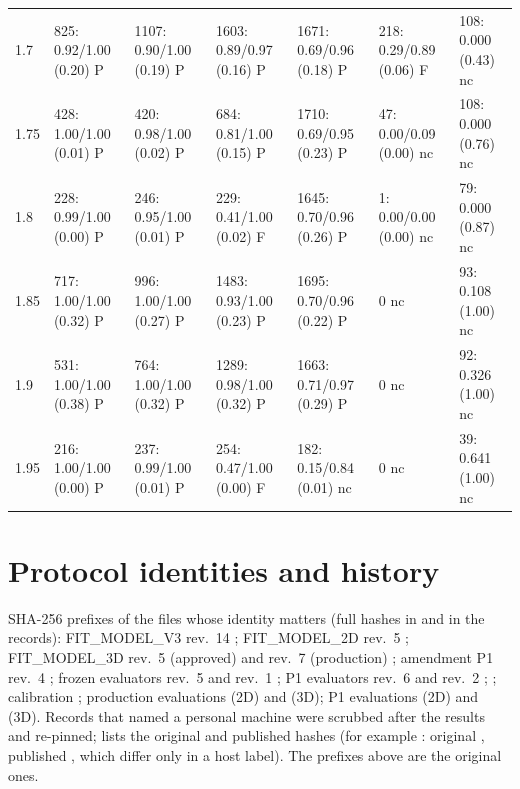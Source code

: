 \begin{table}
\begin{tabular}{@{}lllllll@{}}
1.7 & 825: 0.92/1.00 (0.20) P & 1107: 0.90/1.00 (0.19) P & 1603: 0.89/0.97 (0.16) P & 1671: 0.69/0.96 (0.18) P & 218: 0.29/0.89 (0.06) F & 108: 0.000 (0.43) nc \\
1.75 & 428: 1.00/1.00 (0.01) P & 420: 0.98/1.00 (0.02) P & 684: 0.81/1.00 (0.15) P & 1710: 0.69/0.95 (0.23) P & 47: 0.00/0.09 (0.00) nc & 108: 0.000 (0.76) nc \\
1.8 & 228: 0.99/1.00 (0.00) P & 246: 0.95/1.00 (0.01) P & 229: 0.41/1.00 (0.02) F & 1645: 0.70/0.96 (0.26) P & 1: 0.00/0.00 (0.00) nc & 79: 0.000 (0.87) nc \\
1.85 & 717: 1.00/1.00 (0.32) P & 996: 1.00/1.00 (0.27) P & 1483: 0.93/1.00 (0.23) P & 1695: 0.70/0.96 (0.22) P & 0 nc & 93: 0.108 (1.00) nc \\
1.9 & 531: 1.00/1.00 (0.38) P & 764: 1.00/1.00 (0.32) P & 1289: 0.98/1.00 (0.32) P & 1663: 0.71/0.97 (0.29) P & 0 nc & 92: 0.326 (1.00) nc \\
1.95 & 216: 1.00/1.00 (0.00) P & 237: 0.99/1.00 (0.01) P & 254: 0.47/1.00 (0.00) F & 182: 0.15/0.84 (0.01) nc & 0 nc & 39: 0.641 (1.00) nc \\
\bottomrule\end{tabular}
\end{table}

\section{Protocol identities and history}\label{mc:app:hashes}
SHA-256 prefixes of the files whose identity matters (full hashes in  and in the records):
FIT\_MODEL\_V3 rev.\ 14 ; FIT\_MODEL\_2D rev.\ 5 ; FIT\_MODEL\_3D rev.\ 5 (approved)  and rev.\ 7
(production) ; amendment P1 rev.\ 4 ; frozen evaluators  rev.\ 5  and
 rev.\ 1 ; P1 evaluators rev.\ 6  and rev.\ 2 ; 
; calibration  ; production evaluations  (2D) and  (3D); P1
evaluations  (2D) and  (3D). Records that named a personal machine were scrubbed after the results and
re-pinned;  lists the original and published hashes (for example : original ,
published , which differ only in a host label). The prefixes above are the original ones.

